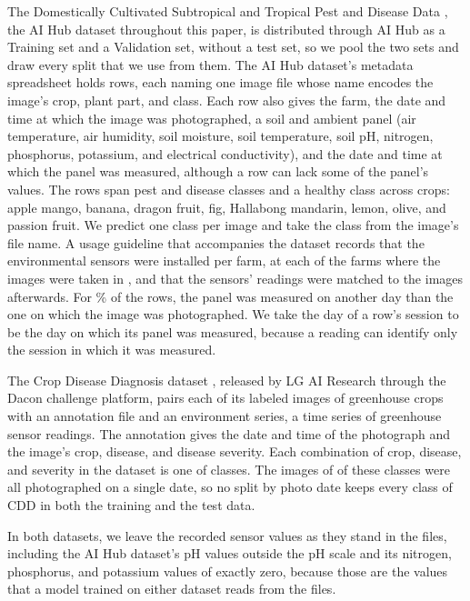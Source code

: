 \documentclass[preprint,12pt,authoryear,nopreprintline]{elsarticle}
\begin{document}
The Domestically Cultivated Subtropical and Tropical Pest and Disease Data
\citep{aihub2023subtropical}, the AI Hub dataset throughout this paper, is
distributed through AI Hub as a Training set and a Validation set, without a test
set, so we pool the two sets and draw every split that we use from them. The AI Hub
dataset's metadata spreadsheet holds \numImages{} rows, each naming one image file whose name
encodes the image's crop, plant part, and class. Each row also gives the farm, the
date and time at which the image was photographed, a soil and ambient panel (air
temperature, air humidity, soil moisture, soil temperature, soil pH, nitrogen,
phosphorus, potassium, and electrical conductivity), and the date and time at which
the panel was measured, although a row can lack some of the panel's values. The rows
span \numClasses{} pest and disease classes and a healthy class across
\numCrops{} crops: apple mango, banana, dragon fruit, fig, Hallabong mandarin,
lemon, olive, and passion fruit. We predict one
class per image and take the class from the image's file name. A usage guideline
that accompanies the dataset \citep{aihub2023subtropical} records that the environmental sensors
were installed per farm, at each of the \numFarms{} farms where the images were taken in
\photoWindow{}, and that the sensors' readings were matched to the images afterwards. For
\pctPhotoDayDiffers{}\% of the rows, the panel was measured on another day than the
one on which the image was photographed. We take the day of a row's session to be the
day on which its panel was measured, because a reading can identify only the session
in which it was measured.

The Crop Disease Diagnosis dataset \citep[CDD;][]{dacon2021cropdisease}, released
by LG AI Research through the Dacon challenge platform, pairs each of its
\cddImages{} labeled images of \cddCrops{} greenhouse crops with an annotation file
and an environment series, a time series of greenhouse sensor readings. The
annotation gives the date and time of the photograph and the image's crop, disease, and
disease severity. Each combination of crop, disease, and severity in the dataset is
one of \cddClasses{} classes. The images of
\cddSingleDateClasses{} of these classes were all photographed on a single date, so no
split by photo date keeps every class of CDD in both the training and the test data.

In both datasets, we leave the recorded sensor values as they stand in the files, including the
AI Hub dataset's pH values outside the pH scale and its nitrogen, phosphorus, and
potassium values of exactly zero, because those are the values that a model trained on
either dataset reads from the files.
\end{document}
